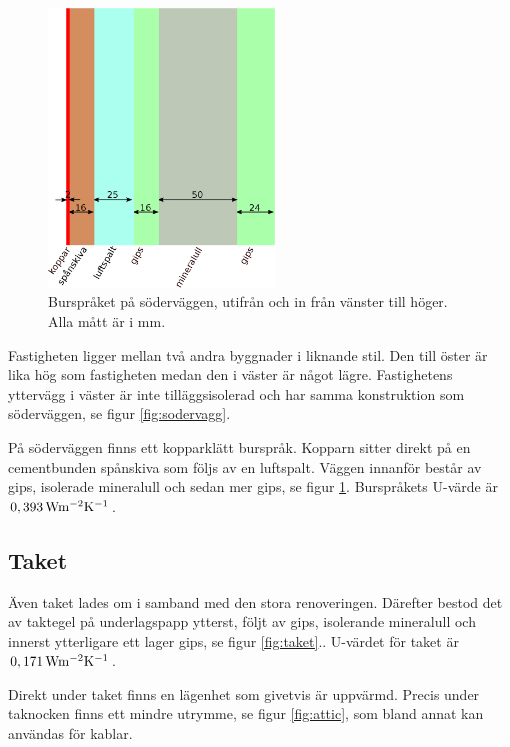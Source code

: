 \begin{figure}[hpbt]
\centering
\includegraphics[width=6cm]{images/bursprak.eps}
\caption{\label{fig:bursprak}{Burspråket på söderväggen, utifrån och in från vänster till höger. Alla mått är i mm.}}
\end{figure}

Fastigheten ligger mellan två andra byggnader i liknande stil. Den till öster är lika hög som fastigheten medan den i väster är något lägre. Fastighetens yttervägg i väster är inte tilläggsisolerad och har samma konstruktion som söderväggen, se figur \ref{fig:sodervagg}.

På söderväggen finns ett kopparklätt burspråk. Kopparn sitter direkt på en cementbunden spånskiva som följs av en luftspalt. Väggen innanför består av gips, isolerade mineralull och sedan mer gips, se figur \ref{fig:bursprak}.\cite{kandidatarbete2010} Burspråkets U-värde är $\unit[0,393]{Wm^{-2}K^{-1}}$.

\subsection{Taket}
Även taket lades om i samband med den stora renoveringen. Därefter bestod det av taktegel på underlagspapp ytterst, följt av gips, isolerande mineralull och innerst ytterligare ett lager gips, se figur \ref{fig:taket}.\cite{kandidatarbete2010}. U-värdet för taket är $\unit[0,171]{Wm^{-2}K^{-1}}$.

Direkt under taket finns en lägenhet som givetvis är uppvärmd. Precis under taknocken finns ett mindre utrymme, se figur \ref{fig:attic}, som bland annat kan användas för kablar.

